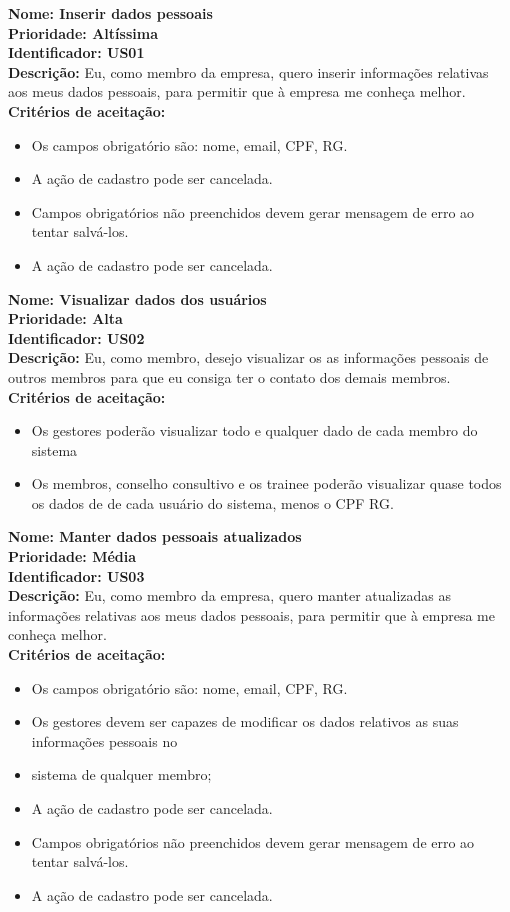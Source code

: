 \begin{anexosenv}
\indent \textbf{Nome: Inserir dados pessoais\\
    \indent Prioridade: Altíssima\\
    \indent Identificador: US01\\
    \indent Descrição:} Eu, como membro da empresa, quero inserir informações relativas aos meus dados pessoais, para permitir que à empresa me conheça melhor.\\
\indent \textbf{Critérios de aceitação:}
\begin{itemize}
    \item Os campos obrigatório são: nome, email, CPF, RG.
    \item A ação de cadastro pode ser cancelada.
    \item Campos obrigatórios não preenchidos devem gerar mensagem de erro ao tentar salvá-los.
    \item A ação de cadastro pode ser cancelada.
\end{itemize}

\indent \textbf{Nome: Visualizar dados dos usuários\\
    \indent Prioridade: Alta\\
    \indent Identificador: US02\\
    \indent Descrição:} Eu, como membro, desejo visualizar os as informações pessoais de outros membros para que eu consiga ter o contato dos demais membros.\\
\indent \textbf{Critérios de aceitação:}
\begin{itemize}
    \item Os gestores poderão visualizar todo e qualquer dado de cada membro do sistema
    \item Os membros, conselho consultivo e os trainee poderão visualizar quase todos os dados de de cada usuário do sistema, menos o CPF RG.
\end{itemize}

\indent \textbf{Nome: Manter dados pessoais atualizados\\
    \indent Prioridade:  Média\\
    \indent Identificador: US03\\
    \indent Descrição:} Eu, como membro da empresa, quero manter atualizadas as informações relativas aos meus dados pessoais, para permitir que à empresa me conheça melhor.\\
\indent \textbf{Critérios de aceitação:}
\begin{itemize}
    \item Os campos obrigatório são: nome, email, CPF, RG.
    \item Os gestores devem ser capazes de modificar os dados relativos as suas informações pessoais no \item sistema de qualquer membro;
    \item A ação de cadastro pode ser cancelada.
    \item Campos obrigatórios não preenchidos devem gerar mensagem de erro ao tentar salvá-los.
    \item A ação de cadastro pode ser cancelada.
\end{itemize}


\end{anexosenv}
